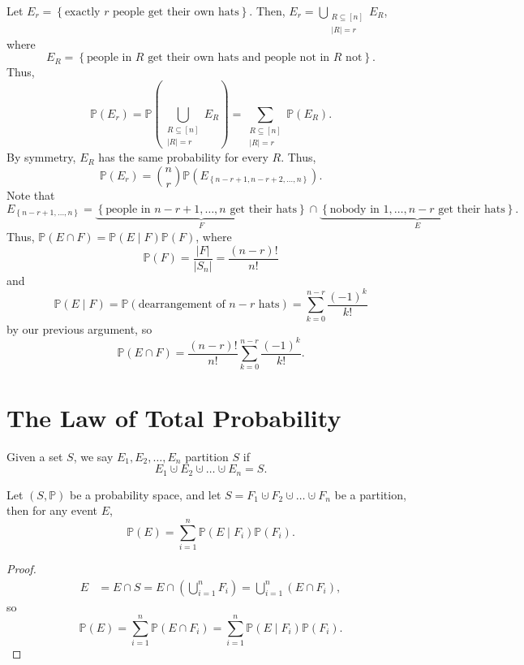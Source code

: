\begin{explanation}
    Let \(E_r = \left\{ \text{exactly } r \text{ people get their own hats}   \right\} \). Then, \(E_r = \bigcup_{\substack{R \subseteq [n] \\ \vert R \vert = r}} E_R\), where
    \[
        E_R = \left\{ \text{people in } R \text{ get their own hats and people not in } R \text{ not}     \right\}. 
    \]  
    Thus, 
    \[
        \mathbb{P} (E_r) = \mathbb{P} \left( \bigcup_{\substack{R \subseteq [n] \\ \vert R \vert = r}} E_R \right) = \sum_{\substack{R \subseteq [n] \\ \vert R \vert = r }} \mathbb{P} (E_R).  
    \]
    By symmetry, \(E_R\) has the same probability for every \(R\). Thus,
    \[
        \mathbb{P} (E_r) = \binom{n}{r} \mathbb{P} \left( E_{\left\{ n - r + 1, n - r + 2, \dots , n \right\} } \right). 
    \]
    Note that 
    \[
        E_{\left\{ n-r+1,\dots ,n \right\} } = \underbrace{\left\{ \text{people in } n-r+1, \dots , n \text{ get their hats}   \right\}}_{F} \cap \underbrace{\left\{ \text{nobody in } 1,\dots ,n-r \text{ get their hats}   \right\}}_{E}.  
    \]
    Thus, \(\mathbb{P} (E \cap F) = \mathbb{P} (E \mid F) \mathbb{P} (F)\), where 
    \[
        \mathbb{P} (F) = \frac{\vert F \vert }{\vert S_n \vert } = \frac{(n-r)!}{n!} 
    \] 
    and 
    \[
        \mathbb{P} (E \mid F) = \mathbb{P} (\text{dearrangement of } n-r \text{ hats}) = \sum_{k=0}^{n-r} \frac{(-1)^k}{k!} 
    \]
    by our previous argument, so 
    \[
        \mathbb{P} (E \cap F) = \frac{(n-r)!}{n!} \sum_{k=0}^{n-r} \frac{(-1)^k}{k!}. 
    \]
\end{explanation}

\section{The Law of Total Probability}
\begin{definition}
    Given a set \(S\), we say \(E_1, E_2, \dots , E_n\) partition \(S\) if 
    \[
        E_1 \cupdot E_2 \cupdot \dots \cupdot E_n = S.
    \]   
\end{definition}

\begin{theorem}
    Let \((S, \mathbb{P} )\) be a probability space, and let \(S = F_1 \cupdot F_2 \cupdot \dots \cupdot F_n\) be a partition, then for any event \(E\),
    \[
        \mathbb{P} (E) = \sum_{i=1}^n \mathbb{P} (E \mid F_i) \mathbb{P} (F_i). 
    \]   
\end{theorem}

\begin{proof}
    \begin{align*}
        E &= E \cap S = E \cap \left( \bigcup_{i=1}^{n} F_i  \right) = \bigcup_{i=1}^{n} (E \cap F_i),  
    \end{align*}
    so 
    \[
        \mathbb{P} (E) = \sum_{i=1}^n \mathbb{P} (E \cap F_i) = \sum_{i=1}^n \mathbb{P} (E \mid F_i) \mathbb{P} (F_i).  
    \]
\end{proof}